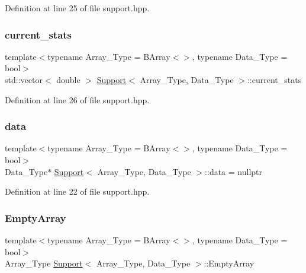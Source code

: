 Definition at line 25 of file support.\+hpp.

\mbox{\label{class_support_ada67557033378742f8592a96f39d1127}} 
\subsubsection{\texorpdfstring{current\+\_\+stats}{current\_stats}}
{\footnotesize\ttfamily template$<$typename Array\+\_\+\+Type  = B\+Array$<$$>$, typename Data\+\_\+\+Type  = bool$>$ \\
std\+::vector$<$ double $>$ \hyperlink{class_support}{Support}$<$ Array\+\_\+\+Type, Data\+\_\+\+Type $>$\+::current\+\_\+stats}



Definition at line 26 of file support.\+hpp.

\mbox{\label{class_support_ad185d111ea5ea3bfe16cf458a36efc63}} 
\subsubsection{\texorpdfstring{data}{data}}
{\footnotesize\ttfamily template$<$typename Array\+\_\+\+Type  = B\+Array$<$$>$, typename Data\+\_\+\+Type  = bool$>$ \\
Data\+\_\+\+Type$\ast$ \hyperlink{class_support}{Support}$<$ Array\+\_\+\+Type, Data\+\_\+\+Type $>$\+::data = nullptr}



Definition at line 22 of file support.\+hpp.

\mbox{\label{class_support_a9364028f9966697e3cdd3fc6a5cd90de}} 
\subsubsection{\texorpdfstring{Empty\+Array}{EmptyArray}}
{\footnotesize\ttfamily template$<$typename Array\+\_\+\+Type  = B\+Array$<$$>$, typename Data\+\_\+\+Type  = bool$>$ \\
Array\+\_\+\+Type \hyperlink{class_support}{Support}$<$ Array\+\_\+\+Type, Data\+\_\+\+Type $>$\+::Empty\+Array}



